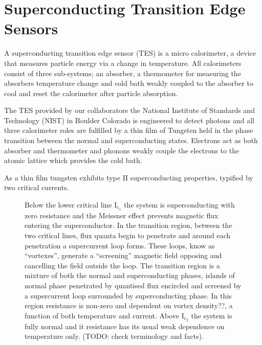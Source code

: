 \documentclass{article}
\begin{document}



\section{Superconducting Transition Edge Sensors}
A superconducting transition edge sensor (TES) is a micro calorimeter, a device
that measures particle energy via a change in temperature. All calorimeters 
consist of three 
sub-systems; an absorber, a thermometer for measuring the absorbers 
temperature change and cold bath weakly coupled to the absorber to cool and 
reset the calorimeter after particle absorption. 

The TES provided by our collaborators the National Institute of Standards and
Technology (NIST) in Boulder Colorado \cite{Lita:08} is engineered to detect
photons and all three calorimeter roles are fulfilled by a thin film of Tungsten
held in the phase transition between the normal and superconducting states.
Electrons act as both absorber and thermometer and phonons weakly couple the
electrons to the atomic lattice which provides the cold bath.

As a thin film tungsten exhibits type II superconducting properties, typified
by two critical currents.

%   
%   
\begin{figure}[!hpbt]
  \centering
  
  \caption{
    Below the lower critical line $\mathrm{I}_{\mathrm{c}_{1}}$ the system is
    superconducting with zero resistance and the Meissner effect prevents
    magnetic flux entering the superconductor. In the transition region, between
    the two critical lines, flux quanta begin to penetrate and around each
    penetration a supercurrent loop forms. These loops, know as ``vortexes'', 
    generate a ``screening'' magnetic field opposing and cancelling the field 
    outside the loop. 
    The transition region is a mixture of both the normal and superconducting
    phases, islands of normal phase penetrated by quantised flux encircled and
    screened by a supercurrent loop surrounded by superconducting phase. In
    this region resistance is non-zero and dependent on vortex density??, a
    function of both temperature and current. Above $\mathrm{I}_{\mathrm{c}_2}$
    the system is fully normal and it resistance has its usual weak
    dependence on temperature only. (TODO: check terminology and facts).
    \label{fig:type2sc}
  }
\end{figure}
\end{document}
